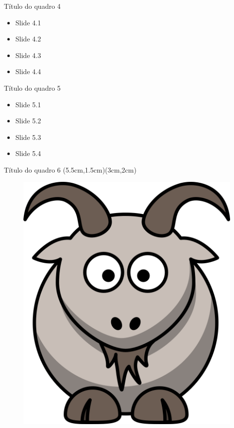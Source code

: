 \documentclass[aspectratio=169]{beamer}
\begin{document}
	\begin{frame}{Título do quadro 4}
		\begin{itemize}[<+->]
			\item Slide 4.1
			\item Slide 4.2
			\item Slide 4.3
			\item Slide 4.4
		\end{itemize}		
	\end{frame}
	
	\begin{frame}{Título do quadro 5}
		\begin{itemize}[<+->]
			\item Slide 5.1
			\item Slide 5.2
			\item Slide 5.3
			\item Slide 5.4
		\end{itemize}		
	\end{frame}
	
	
	\begin{frame}{Título do quadro 6}
		\hypersetup{linkbordercolor=blue}
		(5.5cm,1.5cm)(3cm,2cm)
		\begin{figure}
			\centering
			\includegraphics[scale=0.7]{cabra.png}
		\end{figure}		
	\end{frame}
	
\end{document}
